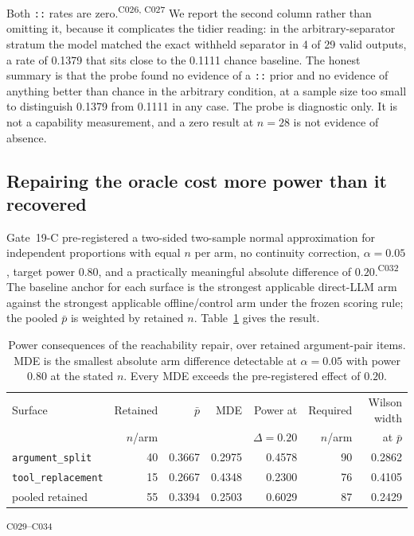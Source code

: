 \documentclass[11pt]{article}
\newcommand{\ledger}[1]{\textsuperscript{\textsf{\scriptsize #1}}}
\newcommand{\dfam}[1]{\texttt{#1}}
\begin{document}
\medskip
Both \texttt{::} rates are zero.\ledger{C026, C027} We report the second
column rather than omitting it, because it complicates the tidier reading: in
the arbitrary-separator stratum the model matched the exact withheld separator
in 4 of 29 valid outputs, a rate of 0.1379 that sits close to the 0.1111
chance baseline. The honest summary is that the probe found no evidence of a
\texttt{::} prior and no evidence of anything better than chance in the
arbitrary condition, at a sample size too small to distinguish 0.1379 from
0.1111 in any case. The probe is diagnostic only. It is not a capability
measurement, and a zero result at $n=28$ is not evidence of absence.

\subsection{Repairing the oracle cost more power than it recovered}
\label{sec:power}

Gate~19-C pre-registered a two-sided two-sample normal approximation for
independent proportions with equal $n$ per arm, no continuity correction,
$\alpha = 0.05$, target power $0.80$, and a practically meaningful absolute
difference of $0.20$.\ledger{C032} The baseline anchor for each surface is the
strongest applicable direct-LLM arm against the strongest applicable
offline/control arm under the frozen scoring rule; the pooled $\bar{p}$ is
weighted by retained $n$. Table~\ref{tab:power} gives the result.

\begin{table}[t]
\centering
\small
\caption{Power consequences of the reachability repair, over retained
argument-pair items. MDE is the smallest absolute arm difference detectable at
$\alpha=0.05$ with power $0.80$ at the stated $n$. Every MDE exceeds the
pre-registered effect of $0.20$.}
\label{tab:power}
\begin{tabular}{@{}lrrrrrr@{}}
\toprule
Surface & Retained & $\bar{p}$ & MDE & Power at & Required & Wilson width \\
        & $n$/arm  &           &     & $\Delta=0.20$ & $n$/arm & at $\bar{p}$ \\
\midrule
\dfam{argument\_split}   & 40 & 0.3667 & 0.2975 & 0.4578 & 90 & 0.2862 \\
\dfam{tool\_replacement} & 15 & 0.2667 & 0.4348 & 0.2300 & 76 & 0.4105 \\
pooled retained         & 55 & 0.3394 & 0.2503 & 0.6029 & 87 & 0.2429 \\
\bottomrule
\end{tabular}
\ledger{C029--C034}
\end{table}
\end{document}
